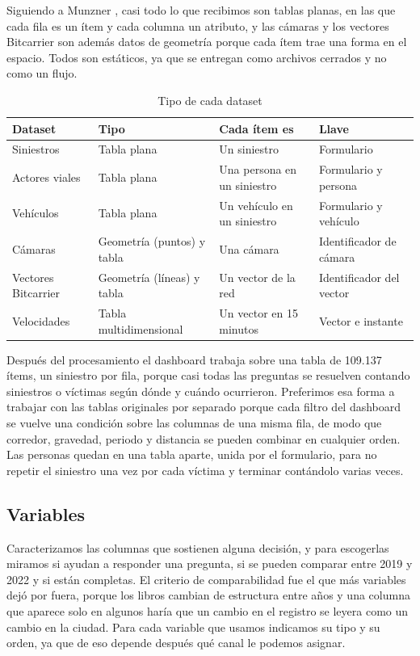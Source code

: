 \documentclass[10pt,a4paper]{article}
\begin{document}
Siguiendo a Munzner \cite{munzner}, casi todo lo que recibimos son tablas planas, en las que cada fila es un ítem y cada columna un atributo, y las cámaras y los vectores Bitcarrier son además datos de geometría porque cada ítem trae una forma en el espacio. Todos son estáticos, ya que se entregan como archivos cerrados y no como un flujo.

\begin{table}[!htbp]\centering\small
\begin{tabularx}{\linewidth}{P{3.6cm}P{3.6cm}LP{3.4cm}}
\toprule
\textbf{Dataset} & \textbf{Tipo} & \textbf{Cada ítem es} & \textbf{Llave}\\
\midrule
Siniestros & Tabla plana & Un siniestro & Formulario\\
Actores viales & Tabla plana & Una persona en un siniestro & Formulario y persona\\
Vehículos & Tabla plana & Un vehículo en un siniestro & Formulario y vehículo\\
Cámaras & Geometría (puntos) y tabla & Una cámara & Identificador de cámara\\
Vectores Bitcarrier & Geometría (líneas) y tabla & Un vector de la red & Identificador del vector\\
Velocidades & Tabla multidimensional & Un vector en 15 minutos & Vector e instante\\
\bottomrule
\end{tabularx}
\caption{Tipo de cada dataset}
\end{table}

Después del procesamiento el dashboard trabaja sobre una tabla de 109.137 ítems, un siniestro por fila, porque casi todas las preguntas se resuelven contando siniestros o víctimas según dónde y cuándo ocurrieron. Preferimos esa forma a trabajar con las tablas originales por separado porque cada filtro del dashboard se vuelve una condición sobre las columnas de una misma fila, de modo que corredor, gravedad, periodo y distancia se pueden combinar en cualquier orden. Las personas quedan en una tabla aparte, unida por el formulario, para no repetir el siniestro una vez por cada víctima y terminar contándolo varias veces.

\subsection{Variables}

Caracterizamos las columnas que sostienen alguna decisión, y para escogerlas miramos si ayudan a responder una pregunta, si se pueden comparar entre 2019 y 2022 y si están completas. El criterio de comparabilidad fue el que más variables dejó por fuera, porque los libros cambian de estructura entre años y una columna que aparece solo en algunos haría que un cambio en el registro se leyera como un cambio en la ciudad. Para cada variable que usamos indicamos su tipo y su orden, ya que de eso depende después qué canal le podemos asignar.
\end{document}
